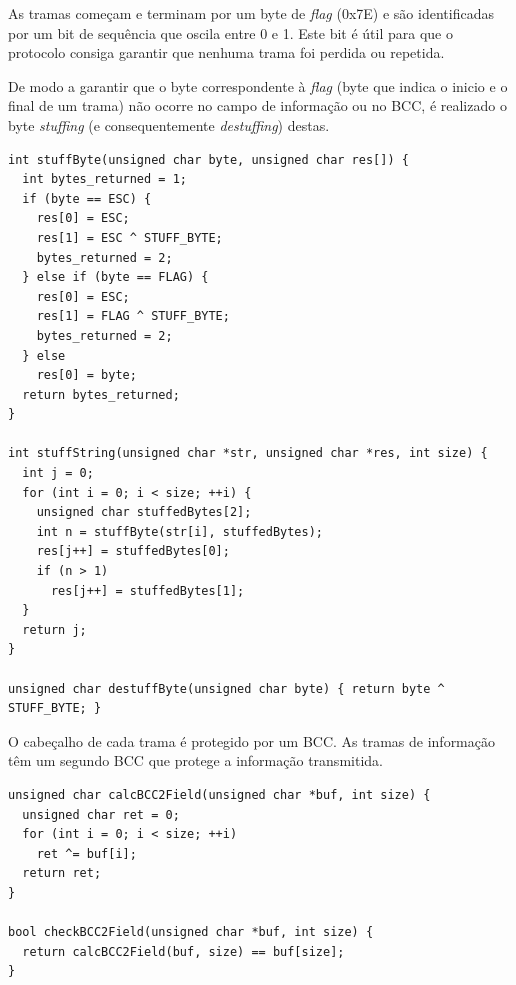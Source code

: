 \documentclass[11pt]{report}
\begin{document}
As tramas começam e terminam por um byte de \textit{flag} (0x7E) e são
identificadas por um bit de sequência que oscila entre 0 e 1. Este bit é útil
para que o protocolo consiga garantir que nenhuma trama foi perdida ou repetida.

De modo a garantir que o byte correspondente à \textit{flag} (byte que indica
o inicio e o final de um trama) não ocorre no campo de informação ou no BCC,
é realizado o byte \textit{stuffing} (e consequentemente \textit{destuffing})
destas.
\begin{lstlisting}
int stuffByte(unsigned char byte, unsigned char res[]) {
  int bytes_returned = 1;
  if (byte == ESC) {
    res[0] = ESC;
    res[1] = ESC ^ STUFF_BYTE;
    bytes_returned = 2;
  } else if (byte == FLAG) {
    res[0] = ESC;
    res[1] = FLAG ^ STUFF_BYTE;
    bytes_returned = 2;
  } else
    res[0] = byte;
  return bytes_returned;
}

int stuffString(unsigned char *str, unsigned char *res, int size) {
  int j = 0;
  for (int i = 0; i < size; ++i) {
    unsigned char stuffedBytes[2];
    int n = stuffByte(str[i], stuffedBytes);
    res[j++] = stuffedBytes[0];
    if (n > 1)
      res[j++] = stuffedBytes[1];
  }
  return j;
}

unsigned char destuffByte(unsigned char byte) { return byte ^ STUFF_BYTE; }
\end{lstlisting}

O cabeçalho de cada trama é protegido por um BCC. As tramas de informação têm um
segundo BCC que protege a informação transmitida.
\begin{lstlisting}
unsigned char calcBCC2Field(unsigned char *buf, int size) {
  unsigned char ret = 0;
  for (int i = 0; i < size; ++i)
    ret ^= buf[i];
  return ret;
}

bool checkBCC2Field(unsigned char *buf, int size) {
  return calcBCC2Field(buf, size) == buf[size];
}
\end{lstlisting}
\end{document}
